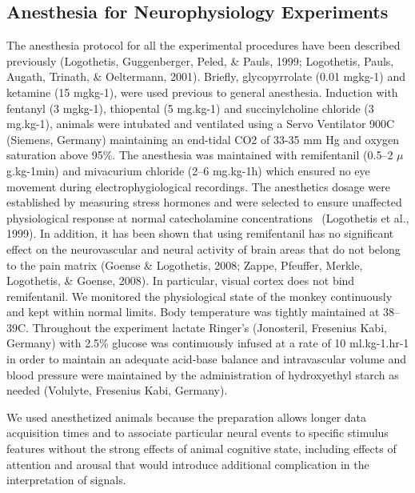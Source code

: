\subsection{Anesthesia for Neurophysiology Experiments}
The anesthesia protocol for all the experimental procedures have been described previously (Logothetis, Guggenberger, Peled, \& Pauls, 1999; Logothetis, Pauls, Augath, Trinath, \& Oeltermann, 2001).
Briefly, glycopyrrolate (0.01 mg{\textperiodcentered}kg{}-1) and ketamine (15 mg{\textperiodcentered}kg{}-1), were used previous to general anesthesia.
Induction with fentanyl (3 mg{\textperiodcentered}kg{}-1), thiopental (5 mg.kg{}-1) and succinylcholine chloride (3 mg.kg{}-1), animals were intubated and ventilated using a Servo Ventilator 900C (Siemens, Germany) maintaining an end-tidal CO2 of 33-35 mm Hg and oxygen saturation above 95\%.
The anesthesia was maintained with remifentanil (0.5--2 $\mu$g.kg{}-1min) and mivacurium chloride (2--6 mg.kg{}-1h) which ensured no eye movement during electrophygiological recordings.
The anesthetics dosage were established by measuring stress hormones and were selected to ensure unaffected physiological response at normal catecholamine concentrations \ (Logothetis et al., 1999).
In addition, it has been shown that using remifentanil has no significant effect on the neurovascular and neural activity of brain areas that do not belong to the pain matrix (Goense \& Logothetis, 2008; Zappe, Pfeuffer, Merkle, Logothetis, \& Goense, 2008).
In particular, visual cortex does not bind remifentanil.
We monitored the physiological state of the monkey continuously and kept within normal limits.
Body temperature was tightly maintained at 38--39{\textdegree}C.
Throughout the experiment lactate Ringer's (Jonosteril, Fresenius Kabi, Germany) with 2.5\% glucose was continuously infused at a rate of 10 ml.kg{}-1.hr{}-1 in order to maintain an adequate acid-base balance and intravascular volume and blood pressure were maintained by the administration of hydroxyethyl starch as needed (Volulyte, Fresenius Kabi, Germany).


We used anesthetized animals because the preparation allows longer data acquisition times and to associate particular neural events to specific stimulus features without the strong effects of animal cognitive state, including effects of attention and arousal that would introduce additional complication in the interpretation of signals.

